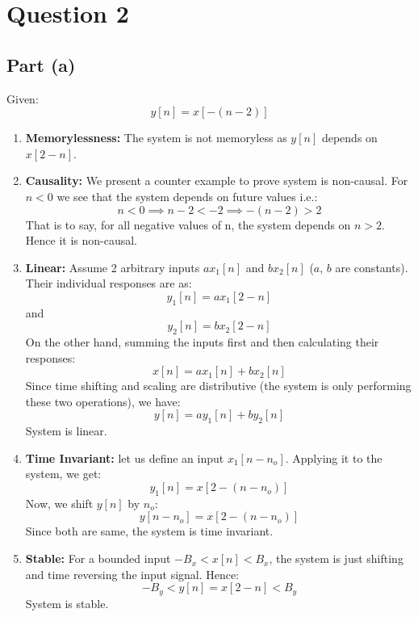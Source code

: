\documentclass[12pt,letterpaper]{article}
\begin{document}
\pagebreak 
\section*{Question 2}
\subsection*{Part (a)}
Given:
    \[
    y[n] = x[-(n-2)]
    \]
\begin{enumerate}
    \item \textbf{Memorylessness:} The system is not memoryless as $y[n]$ depends on $x[2-n]$. 
    \item \textbf{Causality:}
    We present a counter example to prove system is non-causal. For $n < 0$ we see that the system depends on future values i.e.:
    \[
    n<0 \implies n-2 < -2 \implies -(n-2) > 2
    \]
    That is to say, for all negative values of n, the system depends on $n > 2$. Hence it is non-causal. 
    \item \textbf{Linear:} Assume 2 arbitrary inputs $a x_1[n]$ and $bx_2[n]$ ($a$, $b$ are constants). Their individual responses are as:
    \[
    y_1[n] = a x_1[2-n]
    \]
    and 
    \[
    y_2[n] = b x_2[2-n]
    \]
    On the other hand, summing the inputs first and then calculating their responses:
    \[
    x[n] = a x_1[n] + b x_2[n]
    \]
    Since time shifting and scaling are distributive (the system is only performing these two operations), we have: 
    \[
        y[n] = a y_1[n] + by_2[n]
    \]
    System is linear. 
    
    \item \textbf{Time Invariant:}
    let us define an input $x_1[n-n_o]$. Applying it to the system, we get: 
    \[
        y_1[n] = x[2- (n-n_o)]
    \]
    Now, we shift $y[n]$ by $n_o$:
    \[
        y[n-n_o] = x[2- (n-n_o)]
    \]
    Since both are same, the system is time invariant. 
    
    \item \textbf{Stable:} For a bounded input $-B_x<x[n]<B_x$, the system is just shifting and time reversing the input signal. Hence: 
    \[
        -B_y < y[n] = x[2-n] < B_y
    \]
    System is stable. 
    
\end{enumerate}
\end{document}
